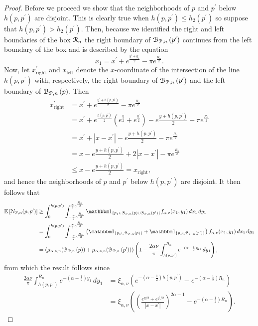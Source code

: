 \begin{proof}
Before we proceed we show that the neighborhoods of $p$ and $p^\prime$ below $h(p,p^\prime)$ are disjoint. This is clearly true when $h(p,p^\prime) \le h_2(p^\prime)$ so suppose that $h(p,p^\prime) > h_2(p^\prime)$. Then, because we identified the right and left boundaries of the box ${\mathcal R}_n$ the right boundary of ${\mathcal B}_{{\mathcal P},n}\left(p^\prime\right)$ continues from the left boundary of the box and is described by the equation
\[
	x_1 = x^\prime + e^{\frac{y^\prime + y_1}{2}} - \pi e^{\frac{R_n}{2}}.
\]
Now, let $x_{\mathrm{right}}^\prime$ and $x_{\mathrm{left}}$ denote the $x$-coordinate of the intersection of the line $h(p,p^\prime)$ with, respectively, the right boundary of ${\mathcal B}_{{\mathcal P},n}\left(p^\prime\right)$ and the left boundary of ${\mathcal B}_{{\mathcal P},n}\left(p\right)$. Then
\begin{align*}
	x_{\mathrm{right}}^\prime &= x^\prime + e^{\frac{y^\prime + h(p,p^\prime)}{2}} - \pi e^{\frac{R_n}{2}}\\
	&= x^\prime + e^{\frac{h(p,p^\prime)}{2}}\left(e^{\frac{y}{2}} + e^{\frac{y^\prime}{2}}\right)
		- e{\frac{y + h(p,p^\prime)}{2}} - \pi e^{\frac{R_n}{2}}\\
	&= x^\prime + |x - x^\prime| - e{\frac{y + h(p,p^\prime)}{2}} - \pi e^{\frac{R_n}{2}}\\
	&= x - e{\frac{y + h(p,p^\prime)}{2}} + 2|x - x^\prime| - \pi e^{\frac{R_n}{2}}\\
	&\le x - e{\frac{y + h(p,p^\prime)}{2}} = x_{\mathrm{right}},
\end{align*}
and hence the neighborhoods of $p$ and $p^\prime$ below $h(p,p^\prime)$ are disjoint. It then follows that
\begin{align*}
	\Exp{\Ncal_{\Pcal,n}(p,p^\prime)} 
	&\ge \int_0^{h(p,p^\prime)} \int_{-\frac{\pi}{2}e^{\frac{R_n}{2}}}^{\frac{\pi}{2}e^{\frac{R_n}{2}}} 
		\ind{p_1 \in \BallPon{p} \cup \BallPon{p^\prime}} f_{\alpha,\nu}(x_1,y_1) \, dx_1 \, dy_1\\
	&= \int_0^{h(p,p^\prime)} \int_{-\frac{\pi}{2}e^{\frac{R_n}{2}}}^{\frac{\pi}{2}e^{\frac{R_n}{2}}} 
		\left(\ind{p_1 \in \BallPon{p}} + \ind{p_1 \in \BallPon{p^\prime}}\right) 
		f_{\alpha,\nu}(x_1,y_1) \, dx_1 \, dy_1\\
	&= \left(\mu_{\alpha,\nu ,n}(\BallPon{p}) + \mu_{\alpha,\nu ,n}(\BallPon{p^\prime})\right)
		\left(1 - \frac{2\alpha \nu}{\pi}\int_{h(p,p^\prime)}^{R_n} e^{-(\alpha - \frac{1}{2})y_1} \, dy_1\right),
\end{align*}
from which the result follows since
\begin{align*}
	\frac{2\alpha \nu}{\pi}\int_{h(p,p^\prime)}^{R_n} e^{-(\alpha - \frac{1}{2})y_1} \, dy_1 
	&= \xi_{\alpha, \nu}\left(e^{-(\alpha - \frac{1}{2})h(p,p^\prime)} - e^{-(\alpha - \frac{1}{2})R_n}\right)\\
	&= \xi_{\alpha, \nu}\left(\left(\frac{e^{y/2} + e^{y^\prime/2}}{|x-x^\prime|}\right)^{2\alpha - 1}
		- e^{-(\alpha - \frac{1}{2})R_n}\right).
\end{align*}
\end{proof}

